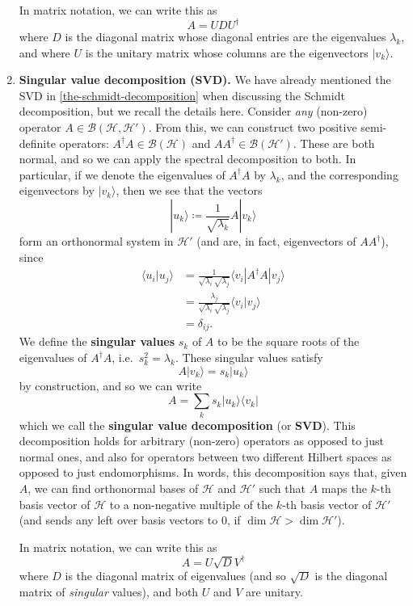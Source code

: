 \documentclass[fleqn]{article}
\begin{document}
\begin{enumerate}
  In matrix notation, we can write this as
  \[
     A = UDU^\dagger
   \]
  where \(D\) is the diagonal matrix whose diagonal entries are the eigenvalues \(\lambda_k\), and where \(U\) is the unitary matrix whose columns are the eigenvectors \(|v_k\rangle\).
\item
  \textbf{Singular value decomposition (SVD).}
  We have already mentioned the SVD in \ref{the-schmidt-decomposition} when discussing the Schmidt decomposition, but we recall the details here.
  Consider \emph{any} (non-zero) operator \(A\in\mathcal{B}(\mathcal{H},\mathcal{H}')\).
  From this, we can construct two positive semi-definite operators: \(A^\dagger A\in\mathcal{B}(\mathcal{H})\) and \(AA^\dagger\in\mathcal{B}(\mathcal{H}')\).
  These are both normal, and so we can apply the spectral decomposition to both.
  In particular, if we denote the eigenvalues of \(A^\dagger A\) by \(\lambda_k\), and the corresponding eigenvectors by \(|v_k\rangle\), then we see that the vectors
  \[
     |u_k\rangle \coloneqq \frac{1}{\sqrt{\lambda_k}}A|v_k\rangle
   \]
  form an orthonormal system in \(\mathcal{H}'\) (and are, in fact, eigenvectors of \(AA^\dagger\)), since
  \[
     \begin{aligned}
       \langle u_i|u_j\rangle
       &= \frac{1}{\sqrt{\lambda_i}\sqrt{\lambda_j}} \langle v_i|A^\dagger A|v_j\rangle
     \\&= \frac{\lambda_j}{\sqrt{\lambda_i}\sqrt{\lambda_j}} \langle v_i|v_j\rangle
     \\&= \delta_{ij}.
     \end{aligned}
   \]
  We define the \textbf{singular values} \(s_k\) of \(A\) to be the square roots of the eigenvalues of \(A^\dagger A\), i.e.~\(s_k^2=\lambda_k\).
  These singular values satisfy
  \[
     A|v_k\rangle=s_k|u_k\rangle
   \]
  by construction, and so we can write
  \[
     A = \sum_k s_k|u_k\rangle\langle v_k|
   \]
  which we call the \textbf{singular value decomposition} (or \textbf{SVD}).
  This decomposition holds for arbitrary (non-zero) operators as opposed to just normal ones, and also for operators between two different Hilbert spaces as opposed to just endomorphisms.
  In words, this decomposition says that, given \(A\), we can find orthonormal bases of \(\mathcal{H}\) and \(\mathcal{H}'\) such that \(A\) maps the \(k\)-th basis vector of \(\mathcal{H}\) to a non-negative multiple of the \(k\)-th basis vector of \(\mathcal{H}'\) (and sends any left over basis vectors to \(0\), if \(\dim\mathcal{H}>\dim\mathcal{H}'\)).

  In matrix notation, we can write this as
  \[
     A = U\sqrt{D}V^\dagger
   \]
  where \(D\) is the diagonal matrix of eigenvalues (and so \(\sqrt{D}\) is the diagonal matrix of \emph{singular} values), and both \(U\) and \(V\) are unitary.


\end{enumerate}
\end{document}
